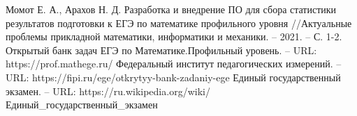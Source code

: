 \begin{thebibliography}{5}
	 Момот Е. А., Арахов Н. Д. Разработка и внедрение ПО для сбора статистики результатов подготовки к ЕГЭ по математике профильного уровня //Актуальные проблемы прикладной математики, информатики и механики. – 2021. – С. 1-2.
	Открытый банк задач ЕГЭ по Математике.Профильный уровень. – URL:  https://prof.mathege.ru/
	Федеральный институт педагогических измерений. – URL:  https://fipi.ru/ege/otkrytyy-bank-zadaniy-ege
	 Единый государственный экзамен. – URL:  https://ru.wikipedia.org/wiki/Единый\_государственный\_экзамен
\end{thebibliography}